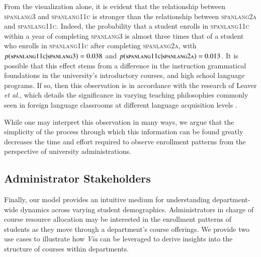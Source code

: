 \documentclass{sigchi}
\begin{document}
From the visualization alone, it is evident that the relationship
between \textsc{spanlang3} and \textsc{spanlang11c} is stronger than
the relationship between \textsc{spanlang2a} and
\textsc{spanlang11c}. Indeed, the probability that a student enrolls
in \textsc{spanlang11c} within a year of completing \textsc{spanlang3}
is almost three times that of a student who enrolls in
\textsc{spanlang11c} after completing \textsc{spanlang2a}, with
$p(\textsc{spanlang11c}|\textsc{spanlang3}) = 0.038$ and
$p(\textsc{spanlang11c}|\textsc{spanlang2a}) = 0.013$. It is possible
that this effect stems from a difference in the instruction
grammatical foundations in the university's introductory courses, and high school language programs. If so, then this observation is in accordance with the research of Leaver \textit{et al.}, which details the significance in varying teaching philosophies commonly seen in foreign language classrooms at different language acquisition levels \cite{Leaver2002}.

While one may interpret this observation in many ways, we argue that the simplicity of the process through which this information can be found greatly decreases the time and effort required to observe enrollment patterns from the perspective of university administrations.

\subsection{Administrator Stakeholders}
\label{sec:administrative_stakeholders}

Finally, our model provides an intuitive medium for
understanding department-wide dynamics across varying student
demographics. Administrators in charge of course resource allocation
may be interested in the enrollment patterns of students as they move
through a department's course offerings. We provide two use cases to illustrate how \textit{Via} can be leveraged to derive insights into the structure of courses within departments.
\end{document}
